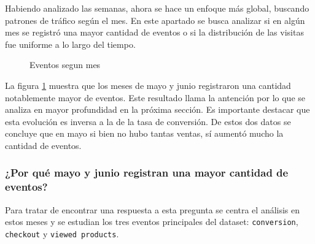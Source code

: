 \documentclass[a4paper]{article}
\begin{document}
Habiendo analizado las semanas, ahora se hace un enfoque más global, buscando patrones de tráfico según el mes. En este apartado se busca analizar si en algún mes se registró una mayor cantidad de eventos o si la distribución de las visitas fue uniforme a lo largo del tiempo.

\begin{figure}[h!]
	\caption{Eventos segun mes}
	\label{fig:mes}
\end{figure}

La figura \ref{fig:mes} muestra que los meses de mayo y junio registraron una cantidad notablemente mayor de eventos. Este resultado llama la antención por lo que se analiza en mayor profundidad en la próxima sección. Es importante destacar que esta evolución es inversa a la de la tasa de conversión. De estos dos datos se concluye que en mayo si bien no hubo tantas ventas, sí aumentó mucho la cantidad de eventos. 

\subsubsection{¿Por qué mayo y junio registran una mayor cantidad de eventos?}

Para tratar de encontrar una respuesta a esta pregunta se centra el análisis en estos meses y se estudian los tres eventos principales del dataset: \texttt{conversion}, \texttt{checkout} y \texttt{viewed products}.
\end{document}
